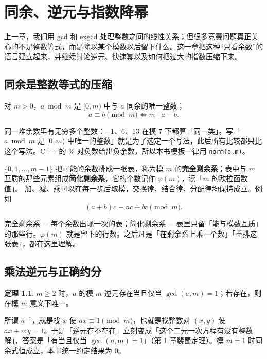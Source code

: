 \documentclass[UTF8,a4paper,11pt,twoside,openright,fontset=fandol]{ctexbook}
\theoremstyle{definition}
\newtheorem{theorem}[definition]{定理}
\begin{document}
\chapter{同余、逆元与指数降幂}
\begin{chapterintro}[章节导读]
上一章，我们用 gcd 和 exgcd 处理整数之间的线性关系；但很多竞赛问题真正关心的不是整数等式，而是除以某个模数以后留下什么。这一章把这种“只看余数”的语言建立起来，并继续讨论逆元、快速幂以及如何把过大的指数压缩下来。
\end{chapterintro}

\section{同余是整数等式的压缩}
对 $m>0$，$a\bmod m$ 是 $[0,m)$ 中与 $a$ 同余的唯一整数；
\[
 a\equiv b\pmod m\iff m\mid a-b.
\]

\begin{tip}
同一堆余数里有无穷多个整数：$-1$、$6$、$13$ 在模 $7$ 下都算「同一类」。写「$a\bmod m$ 是 $[0,m)$ 中唯一的整数」就是为了选定一个写法，此后所有比较都只比这个写法。C++ 的 \% 对负数给出负余数，所以本书模板一律用 \texttt{norm(a,m)}。
\end{tip}

$\{0,1,\ldots,m-1\}$ 把可能的余数排成一张表，称为模 $m$ 的\textbf{完全剩余系}；表中与 $m$ 互质的那些元素组成\textbf{简化剩余系}，它的个数记作 $\varphi(m)$，读「$m$ 的欧拉函数值」。
加、减、乘可以在每一步后取模，交换律、结合律、分配律均保持成立。例如
\[
 (a+b)c\equiv ac+bc\pmod m.
\]

\begin{tip}[剩余系 = 一张余数表]
完全剩余系 = 每个余数出现一次的表；简化剩余系 = 表里只留「能与模数互质」的那些行。$\varphi(m)$ 就是留下的行数。之后凡是「在剩余系上乘一个数」「重排这张表」，都在这里理解。
\end{tip}


\section{乘法逆元与正确约分}
\begin{theorem}
$m\ge2$ 时，$a$ 的模 $m$ 逆元存在当且仅当 $\gcd(a,m)=1$；若存在，则在模 $m$ 意义下唯一。
\end{theorem}

\begin{tip}
所谓 $a^{-1}$，就是找 $x$ 使 $ax\equiv1\pmod m$，也就是找整数对 $(x,y)$ 使 $ax+my=1$。于是「逆元存不存在」立刻变成「这个二元一次方程有没有整数解」，答案是「有当且仅当 $\gcd(a,m)=1$」（第 1 章裴蜀定理）。模 $m=1$ 时同余式恒成立，本书统一约定结果为 $0$。
\end{tip}
\end{document}
